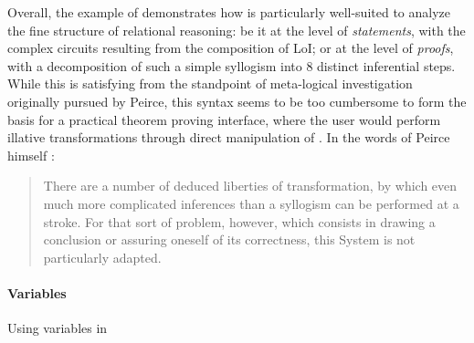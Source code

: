 \begin{scope}
Overall, the example of  demonstrates how 
is particularly well-suited to analyze the fine structure of relational
reasoning: be it at the level of \emph{statements}, with the complex circuits
resulting from the composition of LoI; or at the level of \emph{proofs}, with a
decomposition of such a simple syllogism into 8 distinct inferential steps.
While this is satisfying from the standpoint of meta-logical investigation
originally pursued by Peirce, this syntax seems to be too cumbersome to form the
basis for a practical theorem proving interface, where the user would perform
illative transformations through direct manipulation of . In the words of
Peirce himself \cite[p.~544]{peirce_prolegomena_1906}:
\begin{quote}
  There are a number of deduced liberties of transformation, by which even much
  more complicated inferences than a syllogism can be performed at a stroke. For
  that sort of problem, however, which consists in drawing a conclusion or
  assuring oneself of its correctness, this System is not particularly adapted.
\end{quote}

\paragraph{Variables}

\begin{marginfigure}
  \hspace{-3em}
  \caption{Using variables in }
\end{marginfigure}


\end{scope}

